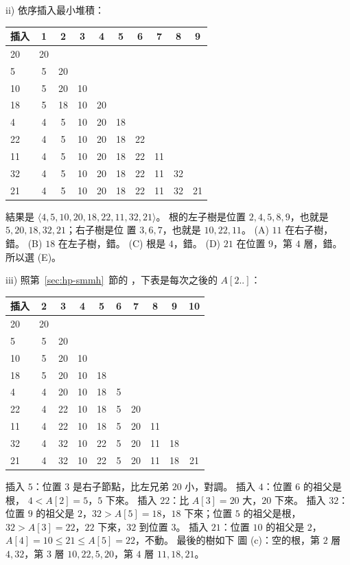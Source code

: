 ii) 依序插入最小堆積：
\begin{center}
\small
\begin{tabular}{l*{9}{c}}
\toprule
插入 & 1 & 2 & 3 & 4 & 5 & 6 & 7 & 8 & 9 \\
\midrule
20 & 20 \\
5 & 5 & 20 \\
10 & 5 & 20 & 10 \\
18 & 5 & 18 & 10 & 20 \\
4 & 4 & 5 & 10 & 20 & 18 \\
22 & 4 & 5 & 10 & 20 & 18 & 22 \\
11 & 4 & 5 & 10 & 20 & 18 & 22 & 11 \\
32 & 4 & 5 & 10 & 20 & 18 & 22 & 11 & 32 \\
21 & 4 & 5 & 10 & 20 & 18 & 22 & 11 & 32 & 21 \\
\bottomrule
\end{tabular}
\end{center}
結果是 $\langle 4,\allowbreak 5,\allowbreak 10,\allowbreak 20,\allowbreak 18,\allowbreak 22,\allowbreak 11,\allowbreak 32,\allowbreak 21 \rangle$。 根的左子樹是位置 $2,\allowbreak 4,\allowbreak 5,\allowbreak 8,\allowbreak 9$，也就是 $5,\allowbreak 20,\allowbreak 18,\allowbreak 32,\allowbreak 21$；右子樹是位
置 $3, 6, 7$，也就是 $10, 22, 11$。 (A) $11$ 在右子樹，錯。 (B) $18$ 在左子樹，錯。 (C) 根是
$4$，錯。 (D) $21$ 在位置 $9$，第 $4$ 層，錯。 所以選 (E)。

iii) 照第~\ref{sec:hp-smmh}~節的 ，下表是每次之後的 $A[2..]$：
\begin{center}
\small
\begin{tabular}{l*{9}{c}}
\toprule
插入 & 2 & 3 & 4 & 5 & 6 & 7 & 8 & 9 & 10 \\
\midrule
20 & 20 \\
5 & 5 & 20 \\
10 & 5 & 20 & 10 \\
18 & 5 & 20 & 10 & 18 \\
4 & 4 & 20 & 10 & 18 & 5 \\
22 & 4 & 22 & 10 & 18 & 5 & 20 \\
11 & 4 & 22 & 10 & 18 & 5 & 20 & 11 \\
32 & 4 & 32 & 10 & 22 & 5 & 20 & 11 & 18 \\
21 & 4 & 32 & 10 & 22 & 5 & 20 & 11 & 18 & 21 \\
\bottomrule
\end{tabular}
\end{center}
插入 $5$：位置 $3$ 是右子節點，比左兄弟 $20$ 小，對調。 插入 $4$：位置 $6$ 的祖父是根，
$4 < A[2] = 5$，$5$ 下來。 插入 $22$：比 $A[3] = 20$ 大，$20$ 下來。 插入 $32$：位置 $9$ 的祖父是
$2$，$32 > A[5] = 18$，$18$ 下來；位置 $5$ 的祖父是根，$32 > A[3] = 22$，$22$ 下來，$32$ 到位置
$3$。 插入 $21$：位置 $10$ 的祖父是 $2$，$A[4] = 10 \le 21 \le A[5] = 22$，不動。 最後的樹如下
圖 (c)：空的根，第 $2$ 層 $4, 32$，第 $3$ 層 $10, 22, 5, 20$，第 $4$ 層 $11, 18, 21$。

